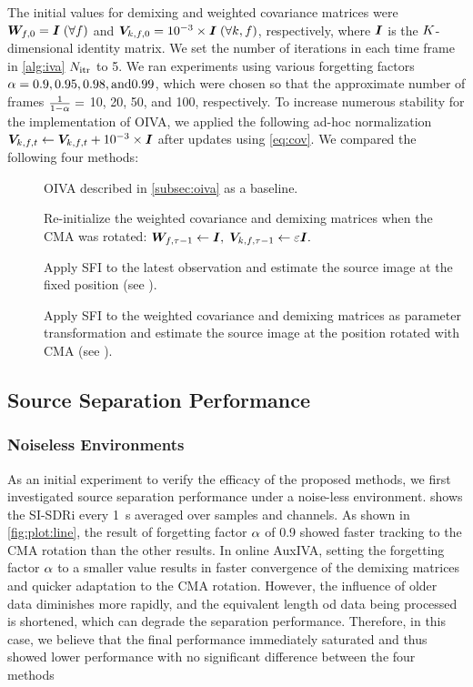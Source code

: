\documentclass[sip,biber]{now-journal}
\begin{document}
The initial values for demixing and weighted covariance matrices were
$\bm{W} _{f,0} = \bm{I}\; (\forall f)$ and $\bm{V} _{k,f,0} = 10^{-3} \times \bm{I}\; (\forall k, f)$, respectively, where $\bm{I}$ is the $K$-dimensional identity matrix.
We set the number of iterations in each time frame in \cref{alg:iva} $N _{\mathrm{itr}}$ to 5.
We ran experiments using various forgetting factors $\alpha = 0.9, 0.95, 0.98, \text{and} 0.99$,
which were chosen so that the approximate number of frames $\frac{1}{1 - \alpha} =$ 10, 20, 50, and 100, respectively.
To increase numerous stability for the implementation of OIVA,
we applied the following ad-hoc normalization $\cov _{\src,\ft} \gets \cov _{\src,\ft} + 10 ^{-3} \times \Eye$ after updates using \eqref{eq:cov}.
We compared the following four methods:
\begin{description}
  \item[\NaiveIVA] OIVA described in \cref{subsec:oiva} as a baseline.
  \item[\ResetIVA] Re-initialize the weighted covariance and demixing matrices when the CMA was rotated:
      $\bm{W} _{f,\tau - 1} \gets \bm{I}, \; \bm{V} _{k,f,\tau - 1} \gets \varepsilon \bm{I}.$
  \item[\SFIIVAo] Apply SFI to the latest observation and estimate the source image at the fixed position (see ).
  \item[\SFIIVAm] Apply SFI to the weighted covariance and demixing matrices as parameter transformation and estimate the source image at the position rotated with CMA (see ).
\end{description}

\subsection{Source Separation Performance}
\subsubsection{Noiseless Environments}

As an initial experiment to verify the efficacy of the proposed methods, we first investigated source separation performance under a noise-less environment.
 shows the SI-SDRi every \SI{1}{\second} averaged over samples and channels.
As shown in \cref{fig:plot:line}, the result of forgetting factor $\alpha$ of 0.9 showed faster tracking to the CMA rotation than the other results.
In online AuxIVA, setting the forgetting factor $\alpha$ to a smaller value results in faster convergence of the demixing matrices and quicker adaptation to the CMA rotation.
However, the influence of older data diminishes more rapidly, and the equivalent length od data being processed is shortened, which can degrade the separation performance.
Therefore, in this case, we believe that the final performance immediately saturated and thus showed lower performance with no significant difference between the four methods
\end{document}
